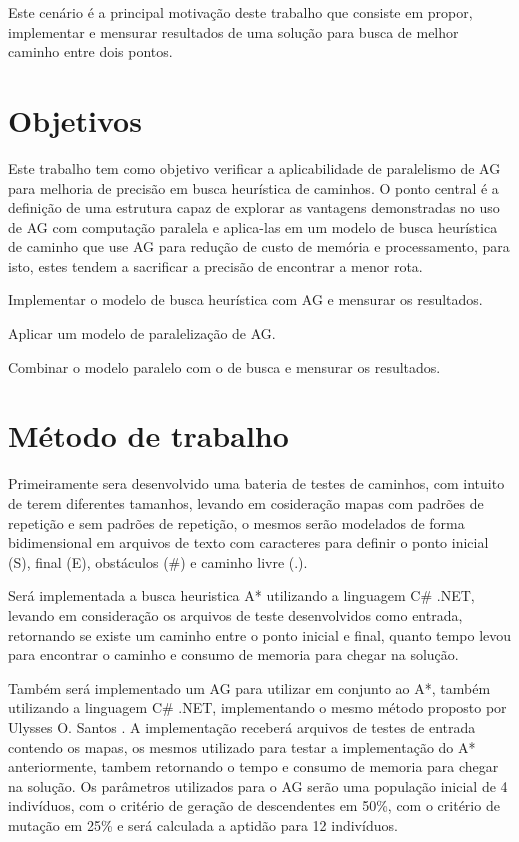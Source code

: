 Este cenário é a principal motivação deste trabalho que consiste em propor, implementar e mensurar resultados de uma solução para busca de melhor caminho entre dois pontos.

\section{Objetivos}

Este trabalho tem como objetivo verificar a aplicabilidade de paralelismo de AG para melhoria de precisão em busca heurística de caminhos. O ponto central é a definição de uma estrutura capaz de explorar as vantagens demonstradas no uso de AG com computação paralela e aplica-las em um modelo de busca heurística de caminho que use AG para redução de custo de memória e processamento, para isto, estes tendem a sacrificar a precisão de encontrar a menor rota. 

Implementar o modelo de busca heurística com AG e mensurar os resultados. 

Aplicar um modelo de paralelização de AG. 

Combinar o modelo paralelo com o de busca e mensurar os resultados.


\section{Método de trabalho}

Primeiramente sera desenvolvido uma bateria de testes de caminhos, com intuito de terem diferentes tamanhos, levando em cosideração mapas com padrões de repetição e sem padrões de repetição, o mesmos serão modelados de forma bidimensional em arquivos de texto com caracteres para definir o ponto inicial (S), final (E), obstáculos (\#) e caminho livre (.).

Será implementada a busca heuristica A* utilizando a linguagem C\# .NET, levando em consideração os arquivos de teste desenvolvidos como entrada, retornando se existe um caminho entre o ponto inicial e final, quanto tempo levou para encontrar o caminho e consumo de memoria para chegar na solução. 

Também será implementado um AG para utilizar em conjunto ao A*, também utilizando a linguagem C\# .NET, implementando o mesmo método proposto por Ulysses O. Santos \cite{Ulysses}. A implementação receberá  arquivos de testes de entrada contendo os mapas, os mesmos  utilizado para testar a implementação do A* anteriormente, tambem retornando o tempo e consumo de memoria para chegar na solução.
Os parâmetros utilizados para o AG serão uma população inicial de 4 indivíduos, com o critério de geração de descendentes em 50\%, com o critério de mutação em 25\% e será calculada a aptidão para 12 indivíduos.


